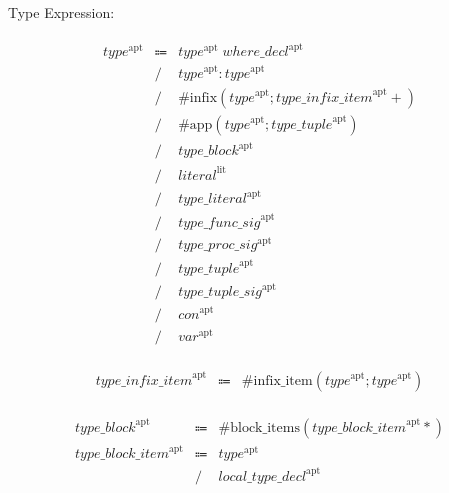 Type Expression:

\begin{align*}
    \begin{array}{rcll}
        \mathit{type}^\mathrm{apt}
        &\Coloneq &\mathit{type}^\mathrm{apt}\; \mathit{where\_decl}^\mathrm{apt} \\
        &\mathrel{/} &\mathit{type}^\mathrm{apt}: \mathit{type}^\mathrm{apt} \\
        &\mathrel{/} &\mathrm{\#infix}(\mathit{type}^\mathrm{apt}; \mathit{type\_infix\_item}^\mathrm{apt}{+}) \\
        &\mathrel{/} &\mathrm{\#app}(\mathit{type}^\mathrm{apt}; \mathit{type\_tuple}^\mathrm{apt}) \\
        &\mathrel{/} &\mathit{type\_block}^\mathrm{apt} \\
        &\mathrel{/} &\mathit{literal}^\mathrm{lit} \\
        &\mathrel{/} &\mathit{type\_literal}^\mathrm{apt} \\
        &\mathrel{/} &\mathit{type\_func\_sig}^\mathrm{apt} \\
        &\mathrel{/} &\mathit{type\_proc\_sig}^\mathrm{apt} \\
        &\mathrel{/} &\mathit{type\_tuple}^\mathrm{apt} \\
        &\mathrel{/} &\mathit{type\_tuple\_sig}^\mathrm{apt} \\
        &\mathrel{/} &\mathit{con}^\mathrm{apt} \\
        &\mathrel{/} &\mathit{var}^\mathrm{apt}
    \end{array}
\end{align*}

\begin{align*}
    \begin{array}{rcll}
        \mathit{type\_infix\_item}^\mathrm{apt}
        &\Coloneq &\mathrm{\#infix\_item}(\mathit{type}^\mathrm{apt}; \mathit{type}^\mathrm{apt})
    \end{array}
\end{align*}

\begin{align*}
    \begin{array}{rcll}
        \mathit{type\_block}^\mathrm{apt}
        &\Coloneq &\mathrm{\#block\_items}(\mathit{type\_block\_item}^\mathrm{apt}{*}) \\
        \mathit{type\_block\_item}^\mathrm{apt}
        &\Coloneq &\mathit{type}^\mathrm{apt} \\
        &\mathrel{/} &\mathit{local\_type\_decl}^\mathrm{apt}
    \end{array}
\end{align*}

